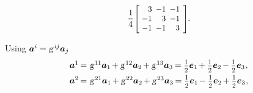 \begin{otherlanguage}{russian}
\begin{tcolorbox}
\[\begin{array}{c}
\displaystyle \frac{1}{4} \hspace{.12ex}
\scalebox{0.92}[0.92]{$\left[\hspace{-0.4ex}\begin{array}{r@{\hspace{.5em}}r@{\hspace{.5em}}r}
3 & -1 & -1 \\
-1 & 3 & -1 \\
-1 & -1 & 3
\end{array}\hspace{-0.12ex}\right]^{\mathstrut}$} \hspace{-0.25ex}.
\end{array}\]

\vspace{-0.5em}Using ${\bm{a}^i = \textsl{g}^{\hspace{.32ex}i\hspace{-0.1ex}j} \bm{a}_j}$
\[\begin{array}{l}
\bm{a}^1 \hspace{-0.2ex}=\hspace{.1ex} \textsl{g}^{\hspace{.2ex}1\hspace{-0.12ex}1} \bm{a}_1 \hspace{-0.2ex} + \textsl{g}^{\hspace{.2ex}12} \bm{a}_2 \hspace{-0.2ex} + \textsl{g}^{\hspace{.2ex}13} \bm{a}_3 \hspace{-0.2ex} = \smalldisplaystyleonehalf \bm{e}_1 \hspace{-0.2ex} + \smalldisplaystyleonehalf \bm{e}_2 \hspace{-0.2ex} - \smalldisplaystyleonehalf \bm{e}_3 \hspace{.1ex},\\[.5em]
%
\bm{a}^2 \hspace{-0.2ex}=\hspace{.1ex} \textsl{g}^{\hspace{.2ex}21} \bm{a}_1 \hspace{-0.2ex} + \textsl{g}^{\hspace{.2ex}22} \bm{a}_2 \hspace{-0.2ex} + \textsl{g}^{\hspace{.2ex}23} \bm{a}_3 \hspace{-0.2ex} = \smalldisplaystyleonehalf \bm{e}_1 \hspace{-0.2ex} - \smalldisplaystyleonehalf \bm{e}_2 \hspace{-0.2ex} + \smalldisplaystyleonehalf \bm{e}_3 \hspace{.1ex},\\[.5em]

\end{array}\]
\end{tcolorbox}
\end{otherlanguage}
